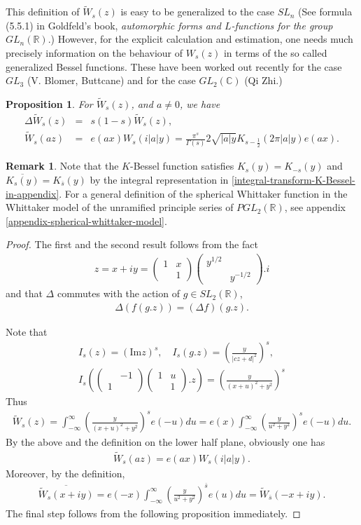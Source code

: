 \documentclass[11pt,reqno]{amsart}
\newcommand{\bea}{\begin{eqnarray}}
\newcommand{\eea}{\end{eqnarray}}
\newcommand{\bna}{\begin{eqnarray*}}
\newcommand{\ena}{\end{eqnarray*}}
\newcommand{\bma}{\begin{pmatrix}}
\newcommand{\ema}{\end{pmatrix}}
\def\im{{\mathrm{Im}}}
\def\C{\mathbb{C}}
\def\R{\mathbb{R}}
\newtheorem{prop}[lemma]{Proposition}
\theoremstyle{definition}
\newtheorem{remark}{Remark}
\begin{document}
This definition of $\tilde W_s(z)$ is easy to be generalized to the case $SL_n$
(See formula (5.5.1) in Goldfeld's book, {\it automorphic forms and $L$-functions for the group $GL_n(\R)$}.)
However, for the explicit calculation and estimation, one needs much precisely
information on the behaviour of $W_s(z)$ in terms of the so called
generalized Bessel functions.
These have been worked out recently for the case $GL_3$ (V. Blomer, Buttcane)
and for the case $GL_2(\C)$ (Qi Zhi.)
\begin{prop}
For $\tilde W_s(z)$, and $a\neq 0$, we have
\bna
\Delta \tilde W_s(z)&=&s(1-s)\tilde W_s(z),\\
\tilde W_{s}(az)&=&e( ax)W_s(i|a|y)
=
\frac{\pi^{s}}{\Gamma(s)} 2\sqrt{|a|y}K_{s-\frac{1}{2}}(2\pi |a|y)e(ax).
\ena
\end{prop}
\begin{remark}
Note that the $K$-Bessel function satisfies $K_s(y)=K_{-s}(y)$
and $\overline{K_s(y)}=K_{\overline{s}}(y)$ by the integral representation in \eqref{integral-transform-K-Bessel-in-appendix}.
For a general definition of the spherical Whittaker function in
the Whittaker model of the unramified principle series of $PGL_2(\R)$, see appendix \ref{appendix-spherical-whittaker-model}.
\end{remark}
\begin{proof}
The first and the second result follows from the fact
\bna
z=x+iy=\bma 1&x\\&1\ema\bma y^{1/2}\\&y^{-1/2}\ema.i
\ena
and that $\Delta$ commutes with the action of $g\in SL_2(\R)$,
\bna
\Delta \left(f(g.z)\right)=\left(\Delta f\right)(g.z).
\ena

Note that
\bna
&I_s(z)=(\im z)^s, \quad I_s(g.z)=\left(\frac{y}{|cz+d|^2}\right)^s,&\\
&I_s\left(\bma &-1 \\ 1\ema\bma 1&u\\&1\ema.z\right)=\left(\frac{y}{(x+u)^2+y^2}\right)^s&
\ena
Thus
\bea
\tilde W_s(z)=
\int_{-\infty}^\infty \left(\frac{y}{(x+u)^2+y^2}\right)^se(-u)du
=e(x)\int_{-\infty}^\infty \left(\frac{y}{u^2+y^2}\right)^se(-u)du\label{tilde-whittaker}.
\eea
By the above and the definition on the lower half plane, obviously one has
\bna
\tilde W_s(az)=e(a x)W_s(i|a|y).
\ena
Moreover, by the definition,
\bna
\overline{\tilde W_s(x+iy)}
=e(-x)\int_{-\infty}^{\infty}\left(\frac{y}{u^2+y^2}\right)^{\overline s} e(u)du
=\tilde W_{\overline s}(-x+iy).
\ena
The final step follows from the
following proposition immediately.
\end{proof}
\end{document}

